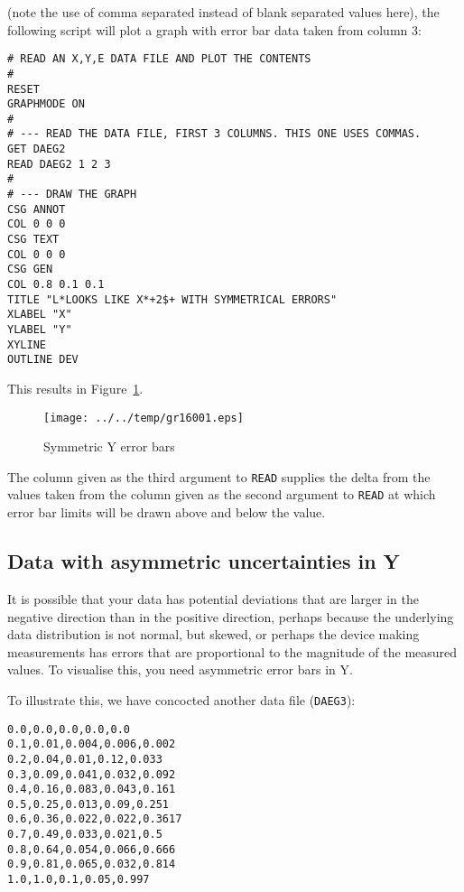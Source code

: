 \documentclass[a4paper,twoside,11pt]{article}
\makeatletter
\def\maxwidth{%
  \ifdim\Gin@nat@width>\linewidth
    \linewidth
  \else
    \Gin@nat@width
  \fi
}
\newcommand{\newpara}{\par\vspace{4mm}\noindent}
\makeatother
\begin{document}
\newpara
(note the use of comma separated instead of blank separated values
here), the following script will plot a graph with error bar data taken
from column 3:

\begin{lstlisting}
# READ AN X,Y,E DATA FILE AND PLOT THE CONTENTS
#
RESET
GRAPHMODE ON
#
# --- READ THE DATA FILE, FIRST 3 COLUMNS. THIS ONE USES COMMAS.
GET DAEG2
READ DAEG2 1 2 3
#
# --- DRAW THE GRAPH
CSG ANNOT
COL 0 0 0
CSG TEXT
COL 0 0 0
CSG GEN
COL 0.8 0.1 0.1
TITLE "L*LOOKS LIKE X*+2$+ WITH SYMMETRICAL ERRORS"
XLABEL "X"
YLABEL "Y"
XYLINE
OUTLINE DEV
\end{lstlisting}

\newpara
This results in Figure~\ref{fig:gr16001}.

\begin{figure}
  \centering
  \texttt{[image: ../../temp/gr16001.eps]}
  \caption{Symmetric Y error bars}
  \label{fig:gr16001}
\end{figure}

\newpara
The column given as the third argument to \texttt{READ} supplies the
delta from the values taken from the column given as the second argument
to \texttt{READ} at which error bar limits will be drawn above and below
the value.

\subsection{Data with asymmetric uncertainties in Y}\label{data-with-asymmetric-uncertainties-in-y}
\newpara
It is possible that your data has potential deviations that are larger
in the negative direction than in the positive direction, perhaps
because the underlying data distribution is not normal, but skewed, or
perhaps the device making measurements has errors that are proportional
to the magnitude of the measured values. To visualise this, you need
asymmetric error bars in Y.

\newpara
To illustrate this, we have concocted another data file
(\texttt{DAEG3}):

\begin{lstlisting}
0.0,0.0,0.0,0.0,0.0
0.1,0.01,0.004,0.006,0.002
0.2,0.04,0.01,0.12,0.033
0.3,0.09,0.041,0.032,0.092
0.4,0.16,0.083,0.043,0.161
0.5,0.25,0.013,0.09,0.251
0.6,0.36,0.022,0.022,0.3617
0.7,0.49,0.033,0.021,0.5
0.8,0.64,0.054,0.066,0.666
0.9,0.81,0.065,0.032,0.814
1.0,1.0,0.1,0.05,0.997
\end{lstlisting}
\end{document}
